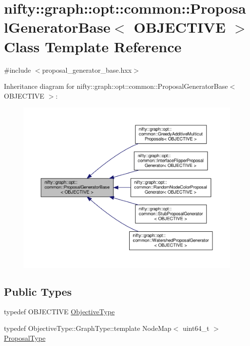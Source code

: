 \hypertarget{classnifty_1_1graph_1_1opt_1_1common_1_1ProposalGeneratorBase}{}\section{nifty\+:\+:graph\+:\+:opt\+:\+:common\+:\+:Proposal\+Generator\+Base$<$ O\+B\+J\+E\+C\+T\+I\+VE $>$ Class Template Reference}
\label{classnifty_1_1graph_1_1opt_1_1common_1_1ProposalGeneratorBase}


{\ttfamily \#include $<$proposal\+\_\+generator\+\_\+base.\+hxx$>$}



Inheritance diagram for nifty\+:\+:graph\+:\+:opt\+:\+:common\+:\+:Proposal\+Generator\+Base$<$ O\+B\+J\+E\+C\+T\+I\+VE $>$\+:
\nopagebreak
\begin{figure}[H]
\begin{center}
\leavevmode
\includegraphics[width=350pt]{classnifty_1_1graph_1_1opt_1_1common_1_1ProposalGeneratorBase__inherit__graph}
\end{center}
\end{figure}
\subsection*{Public Types}
\begin{DoxyCompactItemize}
\item 
typedef O\+B\+J\+E\+C\+T\+I\+VE \hyperlink{classnifty_1_1graph_1_1opt_1_1common_1_1ProposalGeneratorBase_aebac1b29ca57644245abe4a9f00b53d0}{Objective\+Type}
\item 
typedef Objective\+Type\+::\+Graph\+Type\+::template Node\+Map$<$ uint64\+\_\+t $>$ \hyperlink{classnifty_1_1graph_1_1opt_1_1common_1_1ProposalGeneratorBase_a122993da5c326628cdb865a6279d20c5}{Proposal\+Type}
\end{DoxyCompactItemize}
